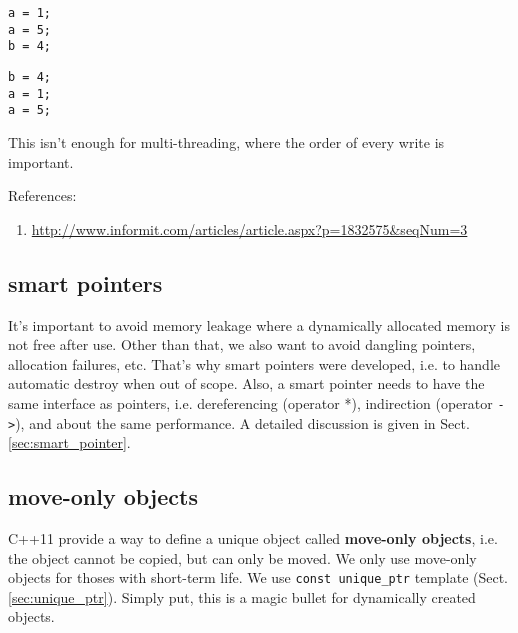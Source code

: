 \begin{minipage}[t]{0.5\textwidth}
\begin{lstlisting}
a = 1;
a = 5;
b = 4;
\end{lstlisting}
\end{minipage}
\begin{minipage}[t]{0.5\textwidth}
\begin{lstlisting}
b = 4;
a = 1;
a = 5;
\end{lstlisting}
\end{minipage}

This isn't enough for multi-threading, where the order of every write is
important. 


References:
\begin{enumerate}
  \item \url{http://www.informit.com/articles/article.aspx?p=1832575&seqNum=3}
\end{enumerate}

\subsection{smart pointers}
\label{sec:c++11_smart_pointer}

It's important to avoid memory leakage where a dynamically allocated memory is
not free after use. Other than that, we also want to avoid dangling pointers,
allocation failures, etc. That's why smart pointers were developed, i.e. to
handle automatic destroy when out of scope. Also, a smart
pointer needs to have the same interface as pointers, i.e. dereferencing (operator *),
indirection (operator \verb!->!), and about the same performance. A detailed
discussion is given in Sect.\ref{sec:smart_pointer}.

\subsection{move-only objects}


C++11 provide a way to define a unique object called {\bf move-only objects},
i.e. the object cannot be copied, but can only be moved. We only use move-only
objects for thoses with short-term life. We use \verb!const unique_ptr! template
(Sect.\ref{sec:unique_ptr}).
Simply put, this is a magic bullet for dynamically created objects.

% 
% 
% 


